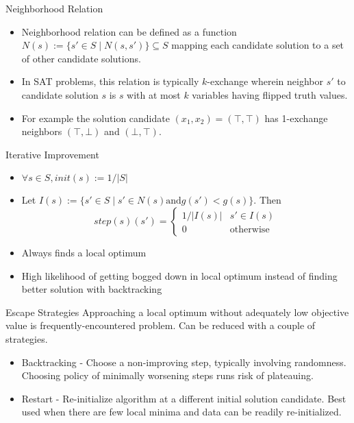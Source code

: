 \documentclass{beamer}
\begin{document}
\begin{frame}{Neighborhood Relation}
\begin{itemize}
    \item Neighborhood relation can be defined as a function $N(s) := \{s' \in S \mid N(s, s')\} \subseteq S$ mapping each candidate solution to a set of other candidate solutions.
    \item In SAT problems, this relation is typically $k$-exchange wherein neighbor $s'$ to candidate solution $s$ is $s$ with at most $k$ variables having flipped truth values.
    \item For example the solution candidate $(x_1, x_2) = (\top, \top)$ has 1-exchange neighbors $(\top, \bot)$ and $(\bot, \top)$.
\end{itemize}
\end{frame}

\begin{frame}{Iterative Improvement}
\begin{itemize}
    \item $\forall s \in S, init(s) := 1/\vert S \vert$
    \item Let $I(s) := \{s' \in S \mid s' \in N(s) \mathrm{and} g(s') < g(s)\}$.  Then 
    \[ step(s)(s') = \begin{cases}
    1/\vert I(s) \vert & s' \in I(s) \\
    0 & \mathrm{otherwise}
    \end{cases}
    \]
    \item Always finds a local optimum
    \item High likelihood of getting bogged down in local optimum instead of finding better solution with backtracking
\end{itemize}
\end{frame}

\begin{frame}{Escape Strategies}
Approaching a local optimum without adequately low objective value is frequently-encountered problem.  Can be reduced with a couple of strategies.
\begin{itemize}
    \item Backtracking - Choose a non-improving step, typically involving randomness.  Choosing policy of minimally worsening steps runs risk of plateauing.
    \item Restart - Re-initialize algorithm at a different initial solution candidate.  Best used when there are few local minima and data can be readily re-initialized.
\end{itemize}
\end{frame}
\end{document}
